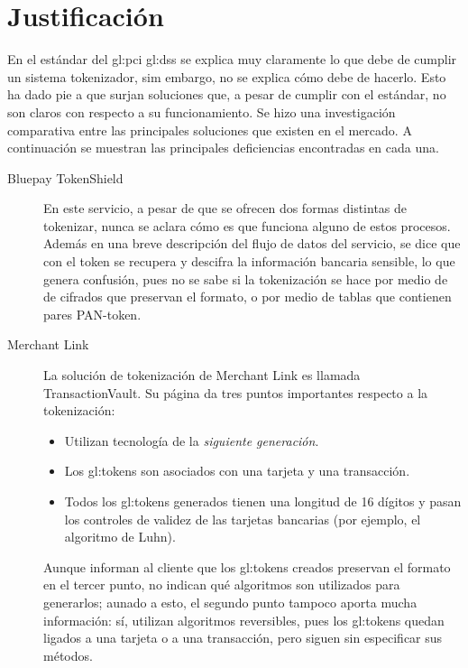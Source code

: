 \section{Justificación}


En el estándar del \gls{gl:pci} \gls{gl:dss} se explica muy claramente lo que
debe de cumplir un sistema tokenizador, sim embargo, no se explica cómo debe de
hacerlo. Esto ha dado pie a que surjan soluciones que, a pesar de cumplir con
el estándar, no son claros con respecto a su funcionamiento. Se hizo una
investigación comparativa entre las principales soluciones que existen en el
mercado. A continuación se muestran las principales deficiencias encontradas
en cada una.

\begin{description}

  \item[Bluepay TokenShield]
    En este servicio, a pesar de que se ofrecen dos formas distintas de
    tokenizar, nunca se aclara cómo es que funciona alguno de estos procesos.
    Además en una breve descripción del flujo de datos del servicio, se dice
    que con el token se recupera y descifra la información bancaria sensible,
    lo que genera confusión, pues no se sabe si la tokenización se hace por
    medio de de cifrados que preservan el formato, o por medio de tablas que
    contienen pares PAN-token.

\end{description}


\begin{description}
  \item[Merchant Link]
    La solución de tokenización de Merchant Link es llamada TransactionVault. Su
    página da tres puntos importantes respecto a la tokenización:
    \begin{itemize}
      \item Utilizan tecnología de la \textit{siguiente generación}.
      \item Los \glspl{gl:token} son asociados con una tarjeta y una transacción.
      \item Todos los \glspl{gl:token} generados tienen una longitud de 16
        dígitos y pasan los controles de validez de las tarjetas bancarias
        (por ejemplo, el algoritmo de Luhn).
      \end{itemize}
      Aunque informan al cliente que los \glspl{gl:token} creados preservan el
      formato en el tercer punto, no indican qué algoritmos son utilizados para
      generarlos; aunado a esto, el segundo punto tampoco aporta mucha
      información: sí, utilizan algoritmos reversibles, pues los
      \glspl{gl:token} quedan ligados a una tarjeta o a una transacción,
      pero siguen sin especificar sus métodos.
\end{description}

